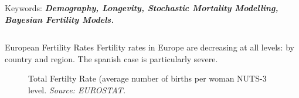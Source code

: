 \documentclass[]{beamer}
\begin{document}
\begin{frame}{\vspace{1ex}\hfill Keywords: \bfseries \textit{Demography, Longevity, Stochastic Mortality Modelling, Bayesian Fertility Models.}}
\begin{columns}[t]
		\begin{block}{European Fertility Rates}
		Fertility rates in Europe are decreasing at all levels: by country and region. The spanish case is particularly severe.
					\begin{figure}[h]
						\caption{\small Total Fertilty Rate (average number of births per woman NUTS-3 level. \textit{Source: EUROSTAT.}}
						\label{pension1}
					\end{figure}\vspace{-0.5cm}

\end{block}
\end{columns}
\end{frame}
\end{document}
